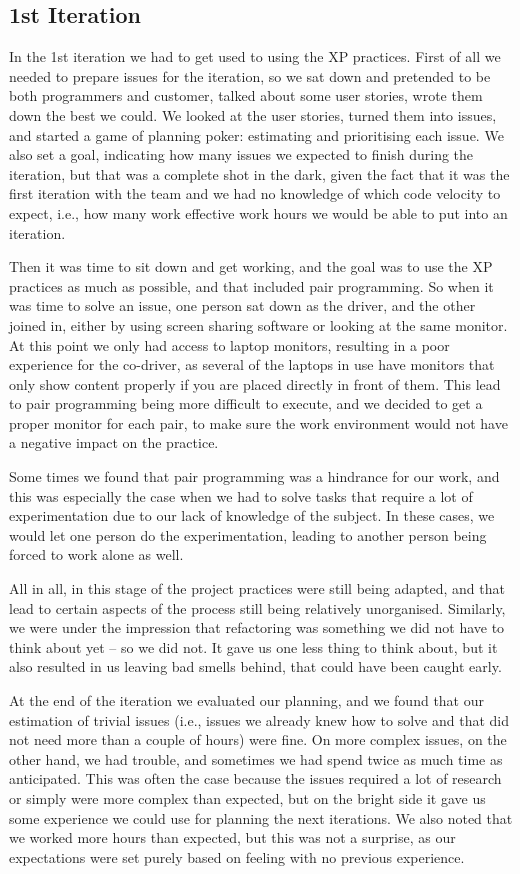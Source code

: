 \subsection{1st Iteration}
In the 1st iteration we had to get used to using the XP practices. First of all we needed to prepare issues for the iteration, so we sat down and pretended to be both programmers and customer, talked about some user stories, wrote them down the best we could. We looked at the user stories, turned them into issues, and started a game of planning poker: estimating and prioritising each issue. We also set a goal, indicating how many issues we expected to finish during the iteration, but that was a complete shot in the dark, given the fact that it was the first iteration with the team and we had no knowledge of which code velocity to expect, i.e., how many work effective work hours we would be able to put into an iteration.

Then it was time to sit down and get working, and the goal was to use the XP practices as much as possible, and that included pair programming. So when it was time to solve an issue, one person sat down as the driver, and the other joined in, either by using screen sharing software or looking at the same monitor. At this point we only had access to laptop monitors, resulting in a poor experience for the co-driver, as several of the laptops in use have monitors that only show content properly if you are placed directly in front of them.
This lead to pair programming being more difficult to execute, and we decided to get a proper monitor for each pair, to make sure the work environment would not have a negative impact on the practice.

Some times we found that pair programming was a hindrance for our work, and this was especially the case when we had to solve tasks that require a lot of experimentation due to our lack of knowledge of the subject. In these cases, we would let one person do the experimentation, leading to another person being forced to work alone as well.

All in all, in this stage of the project practices were still being adapted, and that lead to certain aspects of the process still being relatively unorganised. Similarly, we were under the impression that refactoring was something we did not have to think about yet -- so we did not. It gave us one less thing to think about, but it also resulted in us leaving bad smells behind, that could have been caught early.

At the end of the iteration we evaluated our planning, and we found that our estimation of trivial issues (i.e., issues we already knew how to solve and that did not need more than a couple of hours) were fine. On more complex issues, on the other hand, we had trouble, and sometimes we had spend twice as much time as anticipated. This was often the case because the issues required a lot of research or simply were more complex than expected, but on the bright side it gave us some experience we could use for planning the next iterations. We also noted that we worked more hours than expected, but this was not a surprise, as our expectations were set purely based on feeling with no previous experience.


